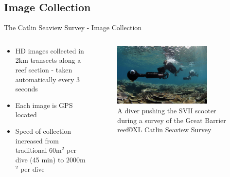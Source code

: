 \documentclass{beamer}
\begin{document}
        \subsection{Image Collection}
            \begin{frame}{The Catlin Seaview Survey - Image Collection }
              \begin{columns}[T]
                \begin{column}{0.48\textwidth}
                  \centering
                  \begin{itemize}
                    \item HD images collected in 2km transects along a reef section - taken automatically every 3 seconds
                    \item Each image is GPS located
                    \item Speed of collection increased from traditional $60$m$^2$ per dive (45 min) to $2000$m$^2$ per dive
                  \end{itemize}
                \end{column}
                \begin{column}{0.48\textwidth}
                  \begin{figure}
                      \centering
                      \includegraphics[width = 0.8\textwidth]{SVII.jpg}
                      \caption{{\footnotesize A diver pushing the SVII scooter during a survey of the Great Barrier reef\footnotemark  \copyright XL Catlin Seaview Survey}}
                  \end{figure}

                \end{column}
              \end{columns}
            \end{frame}
\end{document}
